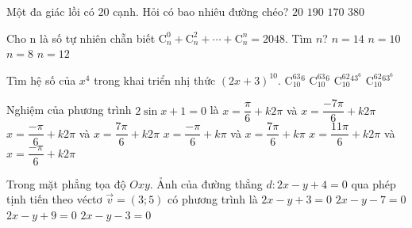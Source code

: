 \begin{ex} %
	Một đa giác lồi có 20 cạnh. Hỏi có bao nhiêu đường chéo?
	\choice
	{$20$}
	{$190$}
	{\True $170$}
	{$380$}
\end{ex}
\begin{ex} %
	Cho n là số tự nhiên chẵn biết $\mathrm{C}_n^0+\mathrm{C}_n^2+\cdots+\mathrm{C}_n^n=2048$. Tìm $n$?
\choice
	{$n=14$}
	{$n=10$}
	{$n=8$}
	{\True $n=12$}
\end{ex}
\begin{ex} %
	Tìm hệ số của $x^4$ trong khai triển nhị thức $\left({2x+3}\right)^{10}$.
	\choice
	{$\mathrm{C}_{10}^63^6$}
	{$\mathrm{C}_{10}^63^6$}
	{\True $\mathrm{C}_{10}^62^43^6$}
	{$\mathrm{C}_{10}^62^63^6$}
\end{ex}
\begin{ex} %
	Nghiệm của phương trình $2\sin x+1=0$ là
	\choice
	{$x=\dfrac{\pi}{6}+k2\pi $ và $x=\dfrac{-7\pi}{6}+k2\pi $}
	{\True $x=\dfrac{-\pi}{6}+k2\pi $ và $x=\dfrac{7\pi}{6}+k2\pi$}
	{$x=\dfrac{-\pi}{6}+k\pi $ và $x=\dfrac{7\pi}{6}+k\pi $}
	{$x=\dfrac{11\pi}{6}+k2\pi $ và $x=\dfrac{-\pi}{6}+k2\pi $}
\end{ex}
\begin{ex} %
	Trong mặt phẳng tọa độ $Oxy$. Ảnh của đường thẳng $d: 2x - y + 4 = 0$ qua phép tịnh tiến theo véctơ $\vec{v}=\left({3;5}\right)$ có phương trình là
	\choice
	{\True $2x-y+3=0$}
	{$2x-y-7=0$}
	{$2x-y+9=0$}
	{$2x-y-3=0$}
\end{ex}
